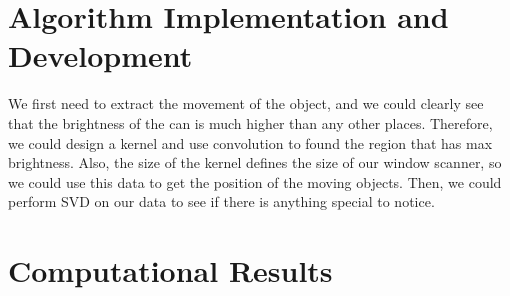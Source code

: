 \documentclass[12pt]{article}
\begin{document}
\section{Algorithm Implementation and Development}
We first need to extract the movement of the object, and we could clearly see that the brightness of the can is much higher than any other places. Therefore, we could design a kernel and use convolution to found the region that has max brightness. Also, the size of the kernel defines the size of our window scanner, so we could use this data to get the position of the moving objects. Then, we could perform SVD on our data to see if there is anything special to notice.
\section{Computational Results}
\end{document}
